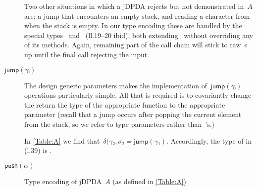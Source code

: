 \begin{description}
  \par
  Two other situations in which a jDPDA rejects but not demonstrated in~$A$ are:
  a \textsf{jump} that encounters an empty stack, and reading a character from when the stack is empty.
  In our type encoding these are handled by the special
  types~ and~ (ll.19--20 ibid), both extending~ without
  overriding any of its methods. Again, remaining part of the call chain will stick to
  raw~s up until the final \cc{\$()} call rejecting the input.
  \item[$\textsf{jump}(γᵢ)$]
  The design generic parameters makes the implementation of~$\textsf{jump}(γᵢ)$
  operations particularly simple. All that is
  required is to covariantly change the return the
  type of the appropriate  function
  to the appropriate  parameter
  (recall that a jump occurs after popping the current element from the stack, so
  we refer to  type parameters rather than~'s.)
  \par
  In \cref{Table:A} we find that~$δ(γ₂,σ₂ =\textsf{jump}(γ₁)$. Accordingly, the type of 
  in  (l.39) is .
  \item[$\textsf{push}(α)$]
\end{description}

\begin{figure}
  \caption{\label{Figure:A}Type encoding of jDPDA~$A$ (as defined in \cref{Table:A})}
\end{figure}
